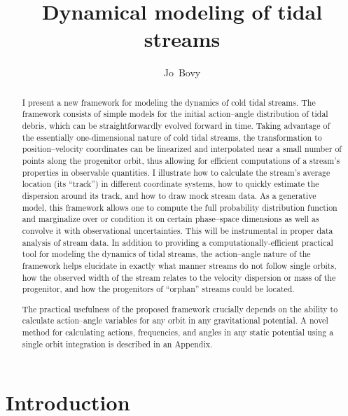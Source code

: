 \documentclass[12pt,preprint]{aastex}
\newcounter{address}
\begin{document}
\title{Dynamical modeling of tidal streams}
\author{Jo~Bovy\altaffilmark{\ref{Hubble}}}

\begin{abstract} 
  I present a new framework for modeling the dynamics of cold tidal
  streams. The framework consists of simple models for the initial
  action--angle distribution of tidal debris, which can be
  straightforwardly evolved forward in time. Taking advantage of the
  essentially one-dimensional nature of cold tidal streams, the
  transformation to position--velocity coordinates can be linearized
  and interpolated near a small number of points along the progenitor
  orbit, thus allowing for efficient computations of a stream's
  properties in observable quantities. I illustrate how to calculate
  the stream's average location (its ``track'') in different
  coordinate systems, how to quickly estimate the dispersion around
  its track, and how to draw mock stream data. As a generative model,
  this framework allows one to compute the full probability
  distribution function and marginalize over or condition it on
  certain phase--space dimensions as well as convolve it with
  observational uncertainties. This will be instrumental in proper
  data analysis of stream data. In addition to providing a
  computationally-efficient practical tool for modeling the dynamics
  of tidal streams, the action--angle nature of the framework helps
  elucidate in exactly what manner streams do not follow single
  orbits, how the observed width of the stream relates to the velocity
  dispersion or mass of the progenitor, and how the progenitors of
  ``orphan'' streams could be located.

  The practical usefulness of the proposed framework crucially depends
  on the ability to calculate action--angle variables for any orbit in
  any gravitational potential. A novel method for calculating actions,
  frequencies, and angles in any static potential using a single orbit
  integration is described in an Appendix.
\end{abstract}



\section{Introduction}
\end{document}
